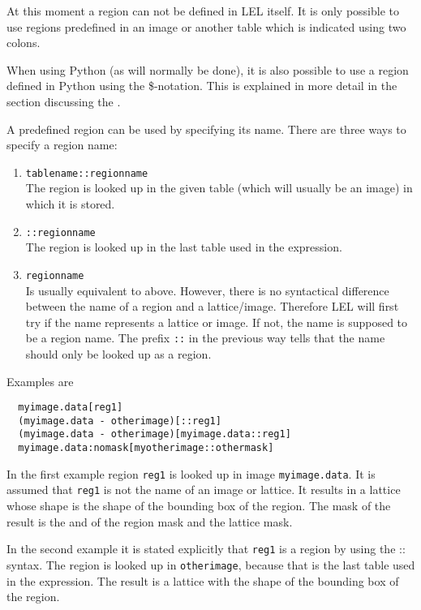 \medskip\noindent At this moment a region can not be defined in LEL itself. It is
only possible to use regions predefined in an image or another table
which is indicated using two colons.

\medskip\noindent When using Python (as will normally be done), it is also possible to use
a region defined in Python using the \$-notation.  This is explained in
more detail in the section discussing the . 

\medskip\noindent A predefined region can be used by specifying its name.
There are three ways to specify a region name:

\begin{enumerate}
\item \texttt{tablename::regionname}  
\\The region is looked up in the given table (which will
usually be an image) in which it is stored.

\item \texttt{::regionname}
\\The region is looked up in the last table used in the expression.

\item \texttt{regionname}
\\Is usually equivalent to above. However, there is no syntactical
difference between the name of a region and a lattice/image.
Therefore LEL will first try if the name represents a lattice or
image. If not, the name is supposed to be a region name.
The prefix \texttt{::} in the previous way tells that the name
should only be looked up as a region.

\end{enumerate}

Examples are

\begin{verbatim}
  myimage.data[reg1]
  (myimage.data - otherimage)[::reg1]
  (myimage.data - otherimage)[myimage.data::reg1]
  myimage.data:nomask[myotherimage::othermask]
\end{verbatim}
In the first example region \texttt{reg1} is looked up in image
\texttt{myimage.data}. It is assumed that \texttt{reg1} is not the
name of an image or lattice.  It results in a lattice whose
shape is the shape of the bounding box of the region.  The
mask of the result is the and of the region mask and the lattice
mask.

\medskip\noindent In the second example it is stated explicitly that \texttt{reg1} is a
region by using the :: syntax.  The region is looked up in
\texttt{otherimage}, because that is the last table used in the
expression. The result is a lattice with the shape of the bounding box 
of the region.

